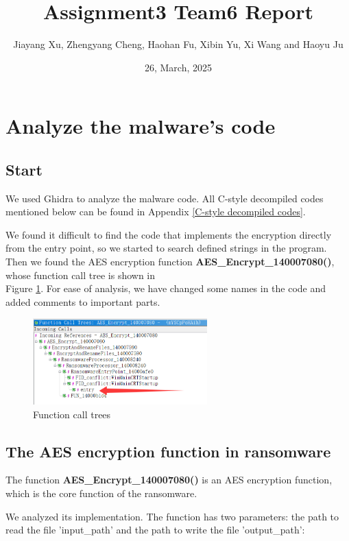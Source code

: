 \documentclass[11pt]{article}
\begin{document}
\title{\textbf{Assignment3 Team6 Report}}
\author{Jiayang Xu, Zhengyang Cheng, Haohan Fu, Xibin Yu, Xi Wang and Haoyu Ju}
\date{26, March, 2025}
\maketitle

\section{Analyze the malware's code}
\subsection{Start}
We used Ghidra to analyze the malware code. All C-style decompiled codes mentioned below can be found in Appendix \ref{C-style decompiled codes}. 

We found it difficult to find the code that implements the encryption directly from the entry point, so we started to search defined strings in the program. Then we found the AES encryption function \textbf{AES\_Encrypt\_140007080()}, whose function call tree is shown in \\Figure \ref{Call Trees}. For ease of analysis, we have changed some names in the code and added comments to important parts. 

\begin{figure}[htbp]
    \centering
    \includegraphics[width=0.6\textwidth]{img/Call Trees.png}
    \caption{Function call trees}
    \label{Call Trees}
\end{figure}

\subsection{The AES encryption function in ransomware}
The function \textbf{AES\_Encrypt\_140007080()} is an AES encryption function, which is the core function of the ransomware.

We analyzed its implementation. The function has two parameters: the path to read the file 'input\_path' and the path to write the file 'output\_path':
\end{document}
